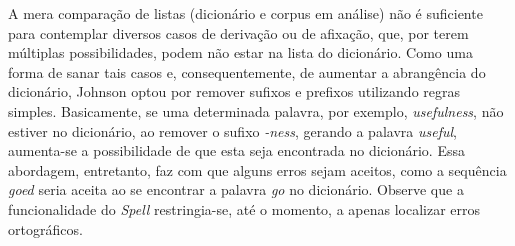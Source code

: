 \documentclass{textolivre}
\begin{document}

A mera comparação de listas (dicionário e 
corpus em análise) não é suficiente para contemplar diversos casos de derivação ou de
afixação, que, por terem múltiplas
possibilidades, podem não estar na lista do
dicionário.
Como uma forma de sanar tais casos e,
consequentemente, de aumentar a abrangência do
dicionário, Johnson optou por remover sufixos e prefixos 
utilizando regras simples. Basicamente, se uma
determinada palavra, por exemplo, \textit{usefulness}, não estiver
no dicionário, ao remover o sufixo \textit{-ness}, gerando a palavra \textit{useful},
aumenta-se a possibilidade de que esta seja encontrada no dicionário. Essa abordagem, entretanto, faz com que alguns erros sejam aceitos,
como a sequência \textit{goed} seria aceita ao se encontrar a palavra \textit{go} no dicionário. Observe que a funcionalidade do \textit{Spell}
restringia-se, até o momento, a apenas localizar
erros ortográficos.
\end{document}
